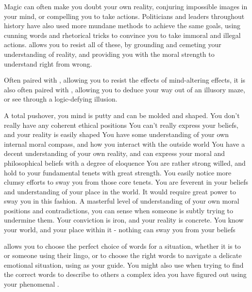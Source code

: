 
Magic can often make you doubt your own reality, conjuring impossible images in your mind, or compelling you to take actions. Politicians and leaders throughout history have also used more mundane methods to achieve the same goals, using cunning words and rhetorical tricks to convince you to take immoral and illegal actions.  allows you to resist all of these, by grounding and cemeting your understanding of reality, and providing you with the moral strength to understand right from wrong. 

Often paired with , allowing you to resist the effects of mind-altering effects, it is also often paired with , allowing you to deduce your way out of an illusory maze, or see through a logic-defying illusion.  

\ratingTable
{A total pushover, you mind is putty and can be molded and shaped. You don't really have any coherent ethical positions}
{You can't really express your beliefs, and your reality is easily shaped}
{You have some understanding of your own internal moral compass, and how you interact with the outside world}
{You have a decent understanding of your own reality, and can express your moral and philosophical beliefs with a degree of eloquence}
{You are rather strong willed, and hold to your fundamental tenets with great strength. You easily notice more clumsy efforts to sway you from those core tenets.}
{You are feverent in your beliefs and understanding of your place in the world. It would require great power to sway you in this fashion.}
{A masterful level of understanding of your own moral positions and contradictions, you can sense when someone is subtly trying to undermine them.}
{Your conviction is iron, and your reality is concrete. You know your world, and your place within it - nothing can sway you from your beliefs}


 allows you to choose the perfect choice of words for a situation, whether it is to  or  someone using their lingo, or to choose the right words to navigate a delicate emotional situation, using  as your guide. You might also use  when trying to find the correct words to describe to others a complex idea you have figured out using your phenomenal .



